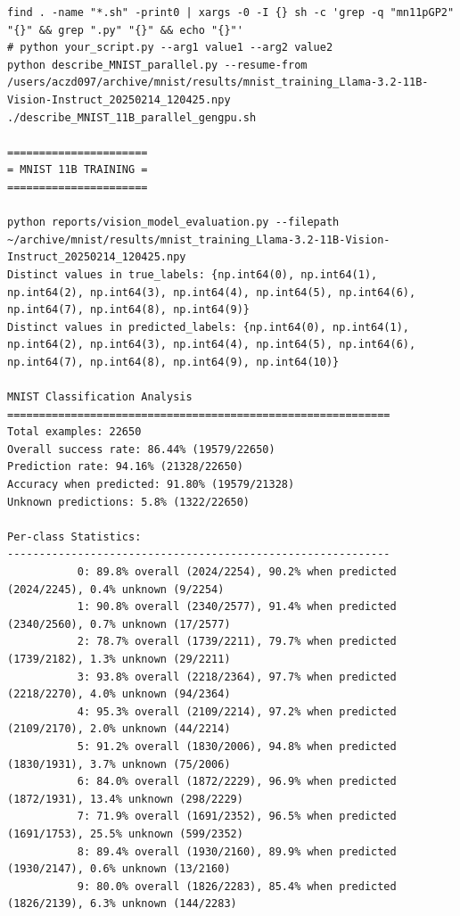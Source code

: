 \begin{verbatim}
find . -name "*.sh" -print0 | xargs -0 -I {} sh -c 'grep -q "mn11pGP2" "{}" && grep ".py" "{}" && echo "{}"'
# python your_script.py --arg1 value1 --arg2 value2
python describe_MNIST_parallel.py --resume-from /users/aczd097/archive/mnist/results/mnist_training_Llama-3.2-11B-Vision-Instruct_20250214_120425.npy
./describe_MNIST_11B_parallel_gengpu.sh

======================
= MNIST 11B TRAINING =
======================   

python reports/vision_model_evaluation.py --filepath ~/archive/mnist/results/mnist_training_Llama-3.2-11B-Vision-Instruct_20250214_120425.npy
Distinct values in true_labels: {np.int64(0), np.int64(1), np.int64(2), np.int64(3), np.int64(4), np.int64(5), np.int64(6), np.int64(7), np.int64(8), np.int64(9)}
Distinct values in predicted_labels: {np.int64(0), np.int64(1), np.int64(2), np.int64(3), np.int64(4), np.int64(5), np.int64(6), np.int64(7), np.int64(8), np.int64(9), np.int64(10)}

MNIST Classification Analysis
============================================================
Total examples: 22650
Overall success rate: 86.44% (19579/22650)
Prediction rate: 94.16% (21328/22650)
Accuracy when predicted: 91.80% (19579/21328)
Unknown predictions: 5.8% (1322/22650)

Per-class Statistics:
------------------------------------------------------------
           0: 89.8% overall (2024/2254), 90.2% when predicted (2024/2245), 0.4% unknown (9/2254)
           1: 90.8% overall (2340/2577), 91.4% when predicted (2340/2560), 0.7% unknown (17/2577)
           2: 78.7% overall (1739/2211), 79.7% when predicted (1739/2182), 1.3% unknown (29/2211)
           3: 93.8% overall (2218/2364), 97.7% when predicted (2218/2270), 4.0% unknown (94/2364)
           4: 95.3% overall (2109/2214), 97.2% when predicted (2109/2170), 2.0% unknown (44/2214)
           5: 91.2% overall (1830/2006), 94.8% when predicted (1830/1931), 3.7% unknown (75/2006)
           6: 84.0% overall (1872/2229), 96.9% when predicted (1872/1931), 13.4% unknown (298/2229)
           7: 71.9% overall (1691/2352), 96.5% when predicted (1691/1753), 25.5% unknown (599/2352)
           8: 89.4% overall (1930/2160), 89.9% when predicted (1930/2147), 0.6% unknown (13/2160)
           9: 80.0% overall (1826/2283), 85.4% when predicted (1826/2139), 6.3% unknown (144/2283)


\end{verbatim}
